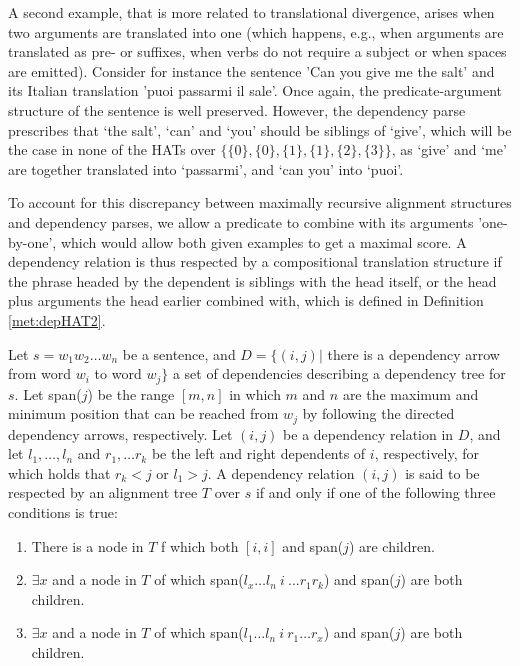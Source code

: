 \documentclass{report}
\begin{document}
A second example, that is more related to translational divergence, arises when two arguments are translated into one (which happens, e.g., when arguments are translated as pre- or suffixes, when verbs do not require a subject or when spaces are emitted). Consider for instance the sentence 'Can you give me the salt' and its Italian translation 'puoi passarmi il sale'. Once again, the predicate-argument structure of the sentence is well preserved. However, the dependency parse prescribes that `the salt', `can' and `you' should be siblings of `give', which will be the case in none of the HATs over $\{\{0\},\{0\},\{1\},\{1\},\{2\},\{3\}\}$, as `give' and `me' are together translated into `passarmi', and `can you' into `puoi'.

To account for this discrepancy between maximally recursive alignment structures and dependency parses, we allow a predicate to combine with its arguments 'one-by-one', which would allow both given examples to get a maximal score. A dependency relation is thus respected by a compositional translation structure if the phrase headed by the dependent is siblings with the head itself, or the head plus arguments the head earlier combined with, which is defined in Definition \ref{met:depHAT2}.

\begin{metric}[Consistency2]\label{met:depHAT2}
Let $s = w_1 w_2 \dots w_n$ be a sentence, and $D = \{ (i,j) |$ there is a dependency arrow from word $w_i$ to word $w_j \}$ a set of dependencies describing a dependency tree for $s$. Let span($j$) be the range $[m,n]$ in which $m$ and $n$ are the maximum and minimum position that can be reached from $w_j$ by following the directed dependency arrows, respectively. Let $(i,j)$ be a dependency relation in $D$, and let $l_1,\ldots,l_n$ and $r_1,\ldots r_k$ be the left and right dependents of $i$, respectively, for which holds that $r_k < j$ or $l_1 > j$. A dependency relation $(i,j)$ is said to be respected by an alignment tree $T$ over $s$ if and only if one of the following three conditions is true: \begin{enumerate}
\item There is a node in $T$ f which both $[i,i]$ and span($j$) are children.
\item $\exists x$  and a node in $T$ of which span($l_x\ldots l_n~i~\ldots r_1 r_k$) and span($j$) are both children.
\item $\exists x$  and a node in $T$ of which span($l_1\ldots l_n~i~r_1\ldots r_x$) and span($j$) are both children.
\end{enumerate} 
\end{metric}
\end{document}
